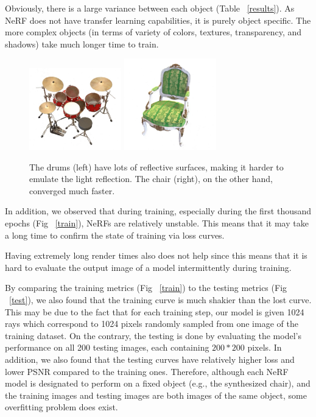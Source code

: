 Obviously, there is a large variance between each object (Table ~\ref{results}). As NeRF does not have transfer learning capabilities, it is purely object specific. The more complex objects (in terms of variety of colors, textures, transparency, and shadows) take much longer time to train.

\begin{figure}[h]
    \centering
    \includegraphics[width=40mm,scale=0.5]{images/drums.png}
    \includegraphics[width=40mm]{images/chair.png}
    \caption{The drums (left) have lots of reflective surfaces, making it harder to emulate the light reflection. The chair (right), on the other hand, converged much faster.}
    \label{ficus}
\end{figure}



In addition, we observed that during training, especially during the first thousand epochs (Fig ~\ref{train}), NeRFs are relatively unstable. This means that it may take a long time to confirm the state of training via loss curves. 

Having extremely long render times also does not help since this means that it is hard to evaluate the output image of a model intermittently during training. 

By comparing the training metrics (Fig ~\ref{train}) to the testing metrics (Fig ~\ref{test}), we also found that the training curve is much shakier than the lost curve. This may be due to the fact that for each training step, our model is given 1024 rays which correspond to 1024 pixels randomly sampled from one image of the training dataset. On the contrary, the testing is done by evaluating the model's performance on all 200 testing images, each containing $200 * 200$ pixels. In addition, we also found that the testing curves have relatively higher loss and lower PSNR compared to the training ones. Therefore, although each NeRF model is designated to perform on a fixed object (e.g., the synthesized chair), and the training images and testing images are both images of the same object, some overfitting problem does exist.

